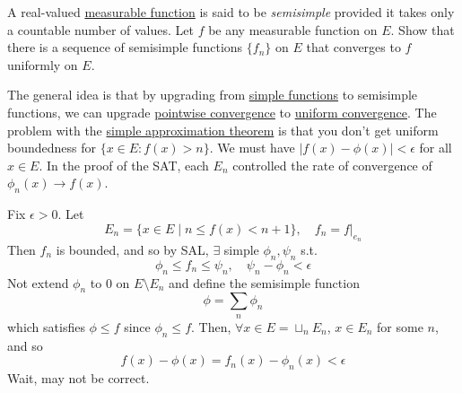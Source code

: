   \begin{exercise}[Royden 3.13]
    A real-valued \hyperref[def:measurable-function]{measurable function} is said to be \emph{semisimple} provided it takes only a countable number of values. Let $f$ be any measurable function on $E$. Show that there is a sequence of semisimple functions $\{f_n\}$ on $E$ that converges to $f$ uniformly on $E$.
  \end{exercise}
  \begin{solution}
    The general idea is that by upgrading from \hyperref[def:simple-functions]{simple functions} to semisimple functions, we can upgrade \hyperref[real-def:pointwise-convergence]{pointwise convergence} to \hyperref[real-def:uniform-convergence]{uniform convergence}. The problem with the \hyperref[thm:simple-approximation-theorem]{simple approximation theorem} is that you don't get uniform boundedness for $\{x \in E \colon f(x) > n\}$. We must have $|f(x) - \phi(x)| < \epsilon$ for all $x \in E$. In the proof of the SAT, each $E_n$ controlled the rate of convergence of $\phi_n (x) \to f(x)$. 

    Fix $\epsilon > 0$. Let 
    \begin{equation}
      E_n = \{ x \in E \mid n \leq f(x) < n + 1 \}, \quad f_n = f|_{e_n}
    \end{equation}
    Then $f_n$ is bounded, and so by SAL, $\exists$ simple $\phi_n, \psi_n$ s.t. 
    \begin{equation}
      \phi_n \leq f_n \leq \psi_n, \quad \psi_n - \phi_n < \epsilon
    \end{equation}
    Not extend $\phi_n$ to $0$ on $E \setminus E_n$ and define the semisimple function 
    \begin{equation}
      \phi = \sum_{n} \phi_n
    \end{equation}
    which satisfies $\phi \leq f$ since $\phi_n \leq f$. Then, $\forall x \in E = \sqcup_{n} E_n$, $x \in E_n$ for some $n$, and so 
    \begin{equation}
      f(x) - \phi(x) = f_n(x) - \phi_n (x) < \epsilon
    \end{equation}
    Wait, may not be correct.
  \end{solution}

